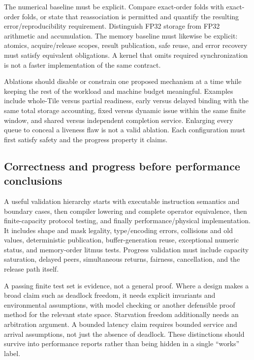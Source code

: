 The numerical baseline must be explicit. Compare exact-order folds with exact-order folds, or state that reassociation is permitted and quantify the resulting error/reproducibility requirement. Distinguish FP32 storage from FP32 arithmetic and accumulation. The memory baseline must likewise be explicit: atomics, acquire/release scopes, result publication, safe reuse, and error recovery must satisfy equivalent obligations. A kernel that omits required synchronization is not a faster implementation of the same contract.

Ablations should disable or constrain one proposed mechanism at a time while keeping the rest of the workload and machine budget meaningful. Examples include whole-Tile versus partial readiness, early versus delayed binding with the same total storage accounting, fixed versus dynamic issue within the same finite window, and shared versus independent completion service. Enlarging every queue to conceal a liveness flaw is not a valid ablation. Each configuration must first satisfy safety and the progress property it claims.

\subsection{Correctness and progress before performance conclusions}

A useful validation hierarchy starts with executable instruction semantics and boundary cases, then compiler lowering and complete operator equivalence, then finite-capacity protocol testing, and finally performance/physical implementation. It includes shape and mask legality, type/encoding errors, collisions and old values, deterministic publication, buffer-generation reuse, exceptional numeric status, and memory-order litmus tests. Progress validation must include capacity saturation, delayed peers, simultaneous returns, fairness, cancellation, and the release path itself.

A passing finite test set is evidence, not a general proof. Where a design makes a broad claim such as deadlock freedom, it needs explicit invariants and environmental assumptions, with model checking or another defensible proof method for the relevant state space. Starvation freedom additionally needs an arbitration argument. A bounded latency claim requires bounded service and arrival assumptions, not just the absence of deadlock. These distinctions should survive into performance reports rather than being hidden in a single ``works'' label.


